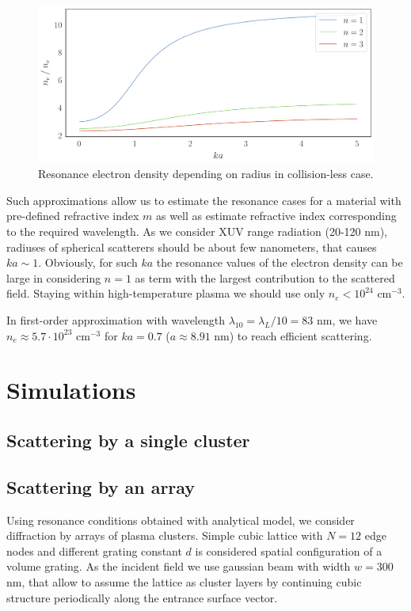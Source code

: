 \documentclass[conference]{IEEEtran}
\begin{document}
	\begin{figure}[htbp]
		\centerline{\includegraphics[width=\columnwidth]{../components/img/sph_base/nenc_123.pdf}}
		\caption{Resonance electron density depending on radius in collision-less case.}
		\label{nenc_123:image}
	\end{figure}

Such approximations allow us to estimate the resonance cases for a material with pre-defined refractive index $m$ as well as estimate refractive index corresponding to the required wavelength. As we consider XUV range radiation (20-120 nm), radiuses of spherical scatterers should be about few nanometers, that causes $ka \sim 1$. Obviously, for such $ ka $ the resonance values of the electron density can be large in considering $n = 1$ as term with the largest contribution to the scattered field. Staying within high-temperature plasma we should use only $n_e < 10^{24}$ $\textrm{cm}^{-3}$.

In first-order approximation with wavelength $\lambda_{10} = \lambda_{L} / 10 = 83$ nm, we have $n_e \approx 5.7 \cdot 10^{23}$ $\textrm{cm}^{-3}$ for $ka = 0.7$ ($a \approx 8.91$ nm) to reach efficient scattering.

\section{Simulations}

\subsection{Scattering by a single cluster}

\subsection{Scattering by an array}

Using resonance conditions obtained with analytical model, we consider diffraction by arrays of plasma clusters. Simple cubic lattice with $N = 12$ edge nodes and different grating constant $d$ is considered spatial configuration of a volume grating. As the incident field we use gaussian beam with width $w = 300$ nm, that allow to assume the lattice as cluster layers by continuing cubic structure periodically along the entrance surface vector.
\end{document}
